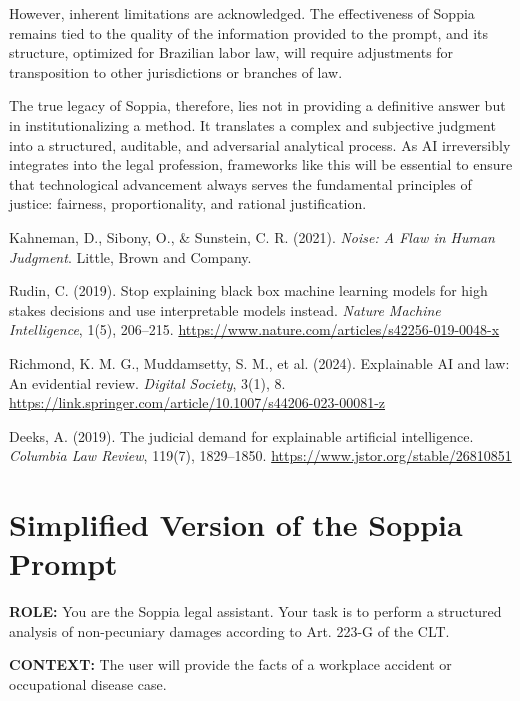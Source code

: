 \documentclass[11pt,a4paper]{article}
\begin{document}
However, inherent limitations are acknowledged. The effectiveness of Soppia remains tied to the quality of the information provided to the prompt, and its structure, optimized for Brazilian labor law, will require adjustments for transposition to other jurisdictions or branches of law.

The true legacy of Soppia, therefore, lies not in providing a definitive answer but in institutionalizing a method. It translates a complex and subjective judgment into a structured, auditable, and adversarial analytical process. As AI irreversibly integrates into the legal profession, frameworks like this will be essential to ensure that technological advancement always serves the fundamental principles of justice: fairness, proportionality, and rational justification.

\begin{thebibliography}{9}

Kahneman, D., Sibony, O., \& Sunstein, C. R. (2021).
\textit{Noise: A Flaw in Human Judgment}.
Little, Brown and Company.

Rudin, C. (2019).
Stop explaining black box machine learning models for high stakes decisions and use interpretable models instead.
\textit{Nature Machine Intelligence}, 1(5), 206--215.
\url{https://www.nature.com/articles/s42256-019-0048-x}

Richmond, K. M. G., Muddamsetty, S. M., et al. (2024).
Explainable AI and law: An evidential review.
\textit{Digital Society}, 3(1), 8.
\url{https://link.springer.com/article/10.1007/s44206-023-00081-z}

Deeks, A. (2019).
The judicial demand for explainable artificial intelligence.
\textit{Columbia Law Review}, 119(7), 1829--1850.
\url{https://www.jstor.org/stable/26810851}

\end{thebibliography}

\newpage
\appendix

\section{Simplified Version of the Soppia Prompt}

\noindent\textbf{ROLE:} You are the Soppia legal assistant. Your task is to perform a structured analysis of non-pecuniary damages according to Art. 223-G of the CLT.

\noindent\textbf{CONTEXT:} The user will provide the facts of a workplace accident or occupational disease case.
\end{document}
